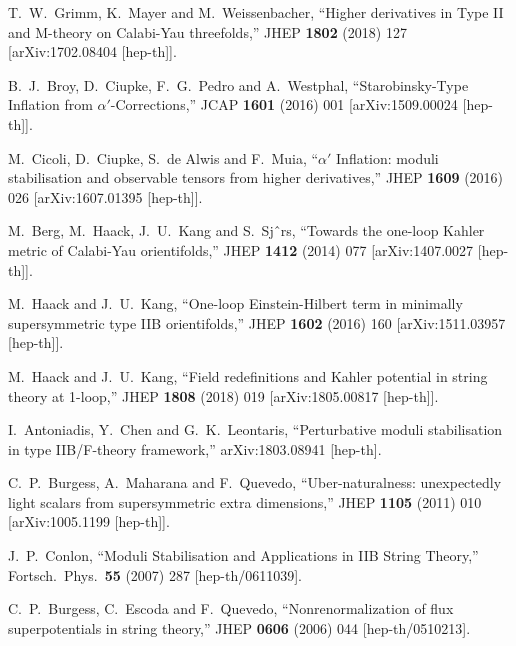 \documentclass[11pt,a4paper]{article}
\begin{document}
\begin{itemize}
\begin{thebibliography}{99}
  T.~W.~Grimm, K.~Mayer and M.~Weissenbacher,
  ``Higher derivatives in Type II and M-theory on Calabi-Yau threefolds,''
  JHEP {\bf 1802} (2018) 127
  [arXiv:1702.08404 [hep-th]].

  B.~J.~Broy, D.~Ciupke, F.~G.~Pedro and A.~Westphal,
  ``Starobinsky-Type Inflation from $\alpha'$-Corrections,''
  JCAP {\bf 1601} (2016) 001
  [arXiv:1509.00024 [hep-th]].

  M.~Cicoli, D.~Ciupke, S.~de Alwis and F.~Muia,
  ``$\alpha'$ Inflation: moduli stabilisation and observable tensors from higher derivatives,''
  JHEP {\bf 1609} (2016) 026
  [arXiv:1607.01395 [hep-th]].

  M.~Berg, M.~Haack, J.~U.~Kang and S.~Sjˆrs,
  ``Towards the one-loop Kahler metric of Calabi-Yau orientifolds,''
  JHEP {\bf 1412} (2014) 077
  [arXiv:1407.0027 [hep-th]].

  M.~Haack and J.~U.~Kang,
  ``One-loop Einstein-Hilbert term in minimally supersymmetric type IIB orientifolds,''
  JHEP {\bf 1602} (2016) 160
  [arXiv:1511.03957 [hep-th]].

  M.~Haack and J.~U.~Kang,
  ``Field redefinitions and Kahler potential in string theory at 1-loop,''
  JHEP {\bf 1808} (2018) 019
  [arXiv:1805.00817 [hep-th]].

  I.~Antoniadis, Y.~Chen and G.~K.~Leontaris,
  ``Perturbative moduli stabilisation in type IIB/F-theory framework,''
  arXiv:1803.08941 [hep-th].

  C.~P.~Burgess, A.~Maharana and F.~Quevedo,
  ``Uber-naturalness: unexpectedly light scalars from supersymmetric extra dimensions,''
  JHEP {\bf 1105} (2011) 010
  [arXiv:1005.1199 [hep-th]].
  
  J.~P.~Conlon,
  ``Moduli Stabilisation and Applications in IIB String Theory,''
  Fortsch.\ Phys.\  {\bf 55} (2007) 287
  [hep-th/0611039].
  
  C.~P.~Burgess, C.~Escoda and F.~Quevedo,
  ``Nonrenormalization of flux superpotentials in string theory,''
  JHEP {\bf 0606} (2006) 044
  [hep-th/0510213].
  

\end{thebibliography}
\end{itemize}
\end{document}

